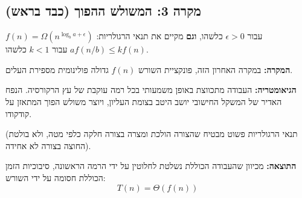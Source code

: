 \documentclass[11pt, a4paper]{article}
\begin{document}
\vspace{0.5cm}
\begin{center}
\end{center}
\vspace{0.5cm}

\subsection*{מקרה 3: המשולש ההפוך (כבד בראש)}

\begin{tcolorbox}[colback=accent2!10, colframe=accent2, title=\textbf{התנאי}]
$f(n) = \Omega(n^{\log_b a + \epsilon})$ עבור $\epsilon > 0$ כלשהו, \textbf{וגם} מקיים את תנאי הרגולריות: $a f(n/b) \le k f(n)$ עבור $k < 1$ כלשהו.
\end{tcolorbox}

\textbf{המקרה:} במקרה האחרון הזה, פונקציית השורש $f(n)$ גדולה פולינומית מספירת העלים.

\textbf{הגיאומטריה:} העבודה מתכווצת באופן משמעותי בכל רמה עוקבת של עץ הרקורסיה. הנפח האדיר של המשקל החישובי יושב היטב בצומת העליון, ויוצר משולש הפוך המתאזן על קודקודו.

(תנאי הרגולריות פשוט מבטיח שהצורה הולכת ומצרה בצורה חלקה כלפי מטה, ולא בולטת החוצה בצורה לא אחידה).

\textbf{התוצאה:} מכיוון שהעבודה הכוללת נשלטת לחלוטין על ידי הרמה הראשונה, סיבוכיות הזמן הכוללת חסומה על ידי השורש:
\begin{equation*}
    T(n) = \Theta(f(n))
\end{equation*}
\end{document}
